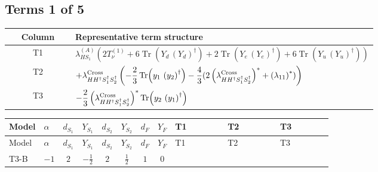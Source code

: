 \documentclass[8pt]{article}
\begin{document}
\begin{landscape}
\subsection*{Terms 1 of 5}
\begin{center}
\begin{tabular}{@{}c >{\raggedright\arraybackslash}p{0.82\linewidth}@{}}
\toprule
Column & Representative term structure \\
\midrule
T1 & \(\displaystyle {\lambda_{HS_1}^{(A)}} (2 T_{\nu}^{(1)}+6 \operatorname{Tr}\!\left({Y_d}\,\left({Y_d}\right)^{\dagger}\right)+2 \operatorname{Tr}\!\left({Y_e}\,\left({Y_e}\right)^{\dagger}\right)+6 \operatorname{Tr}\!\left({Y_u}\,\left({Y_u}\right)^{\dagger}\right))\) \\
\midrule
T2 & \(\displaystyle +{\lambda_{H H^\dagger S_1^\dagger S_2^\dagger}^{\rm Cross}} \left(-\frac{2}{3} \operatorname{Tr}\!\left({y_1}\,\left({y_2}\right)^{\dagger}\right)-\frac{4}{3} (2 \left({\lambda_{H H^\dagger S_1^\dagger S_2^\dagger}^{\rm Cross}}\right)^{*}+\left({\lambda_{11}}\right)^{*})\right)\) \\
\midrule
T3 & \(\displaystyle -\frac{2}{3} \left({\lambda_{H H^\dagger S_1^\dagger S_2^\dagger}^{\rm Cross}}\right)^{*} \operatorname{Tr}\!\left({y_2}\,\left({y_1}\right)^{\dagger}\right)\) \\
\midrule
\bottomrule
\end{tabular}
\end{center}
\smallskip
\tiny
\begin{longtable}{@{}llcccccc >{\raggedright\arraybackslash}p{0.21\linewidth} >{\raggedright\arraybackslash}p{0.21\linewidth} >{\raggedright\arraybackslash}p{0.21\linewidth}@{}}
\toprule
Model & $\alpha$ & $d_{S_1}$ & $Y_{S_1}$ & $d_{S_2}$ & $Y_{S_2}$ & $d_F$ & $Y_F$ & T1 & T2 & T3 \\
\midrule
\endfirsthead
\toprule
Model & $\alpha$ & $d_{S_1}$ & $Y_{S_1}$ & $d_{S_2}$ & $Y_{S_2}$ & $d_F$ & $Y_F$ & T1 & T2 & T3 \\
\midrule
\endhead
T3-B & $-1$ & $2$ & $-\frac{1}{2}$ & $2$ & $\frac{1}{2}$ & $1$ & $0$ & \scriptsize\adjustbox{max width=\linewidth}{$\begin{gathered} {\lambda_{HS_1}^{(A)}} (2 T_{\nu}^{(1)}+6 \operatorname{Tr}\!\left({Y_d}\,\left({Y_d}\right)^{\dagger}\right)+2 \operatorname{Tr}\!\left({Y_e}\,\left({Y_e}\right)^{\dagger}\right)+6 \operatorname{Tr}\!\left({Y_u}\,\left({Y_u}\right)^{\dagger}\right))\end{gathered}$} & \scriptsize\adjustbox{max width=\linewidth}{$\begin{gathered} +{\lambda_{H H^\dagger S_1^\dagger S_2^\dagger}^{\rm Cross}} \left(-\frac{2}{3} \operatorname{Tr}\!\left({y_1}\,\left({y_2}\right)^{\dagger}\right)-\frac{4}{3} (2 \left({\lambda_{H H^\dagger S_1^\dagger S_2^\dagger}^{\rm Cross}}\right)^{*}+\left({\lambda_{11}}\right)^{*})\right)\end{gathered}$} & \scriptsize\adjustbox{max width=\linewidth}{$\begin{gathered} -\frac{2}{3} \left({\lambda_{H H^\dagger S_1^\dagger S_2^\dagger}^{\rm Cross}}\right)^{*} \operatorname{Tr}\!\left({y_2}\,\left({y_1}\right)^{\dagger}\right)\end{gathered}$} \\

\end{longtable}
\end{landscape}
\end{document}
